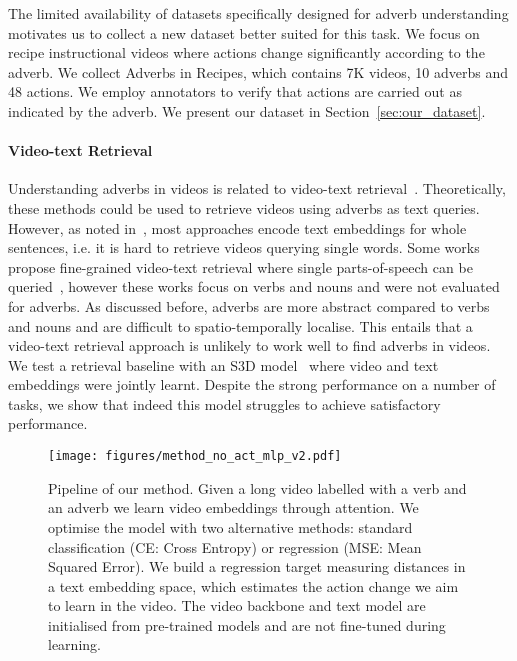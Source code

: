 \documentclass[10pt,twocolumn,letterpaper]{article}
\newcommand{\fparagraph}[1]{\paragraph{#1}}
\begin{document}
The limited availability of datasets specifically designed for adverb understanding motivates us to collect a new dataset better suited for this task. We focus on recipe instructional videos where actions change significantly according to the adverb. We collect Adverbs in Recipes, which contains 7K videos, 10 adverbs and 48 actions. We employ annotators to verify that actions are carried out as indicated by the adverb. We present our dataset in Section~\ref{sec:our_dataset}.

\vspace{-12pt}
\fparagraph{Video-text Retrieval} Understanding adverbs in videos is related to video-text retrieval~\cite{anne2017localizing,krishna2017dense,gao2017tall,mithun2018learning,liu2019use,wang2019language,dong2019dual,miech19endtoend,mun2020local,zeng2020dense,yang2021taco}. 
Theoretically, these methods could be used to retrieve videos using adverbs 
as text queries.
However, as noted in~\cite{doughty2022you}, most approaches encode text embeddings for whole sentences, 
i.e. it is hard to retrieve videos querying single words. Some works propose fine-grained video-text retrieval where single parts-of-speech can be queried~\cite{xu2015jointly,yu2017end,wray2019fine,chen2020fine}, however these works focus on verbs and nouns and were not evaluated for adverbs. As discussed before, adverbs are more abstract 
compared to verbs and nouns and are difficult to spatio-temporally localise. 
This entails that 
a video-text retrieval approach is unlikely to work well to find adverbs in videos. 
We test a retrieval baseline with an S3D model~\cite{miech19endtoend} where video and text embeddings were jointly learnt. Despite the strong performance 
on a number of tasks, we show that indeed this model struggles to achieve satisfactory performance. 

\begin{figure*}[t]
    \centering
    \texttt{[image: figures/method\_no\_act\_mlp\_v2.pdf]}
    \caption{Pipeline of our method. Given a long video  labelled with a verb  and an adverb  we learn video embeddings  through attention. We optimise the model with two alternative methods: standard classification (CE: Cross Entropy) or regression (MSE: Mean Squared Error). We build a regression target measuring distances in a text embedding space, which estimates the action change we aim to learn in the video. The video backbone and text model are initialised from pre-trained models and are not fine-tuned during learning.}
    \label{fig:method}
    \vspace{-10pt}
\end{figure*}
\end{document}
